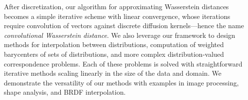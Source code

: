 After discretization, our algorithm for approximating Wasserstein distances becomes a simple iterative scheme with linear convergence, whose iterations require convolution of vectors against discrete diffusion kernels---hence the name \emph{convolutional Wasserstein distance}.  We also leverage our framework to design methods for interpolation between distributions, computation of weighted barycenters of sets of distributions, and more complex distribution-valued correspondence problems. Each of these problems is solved with straightforward iterative methods scaling linearly in the size of the data and domain.  We demonstrate the versatility of our methods with examples in image processing, shape analysis, and BRDF interpolation.



